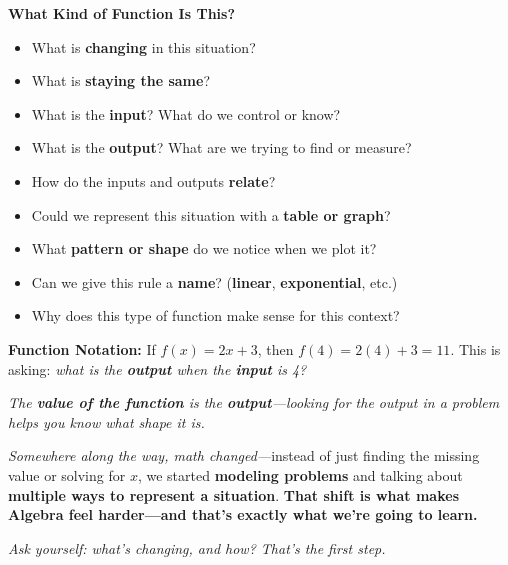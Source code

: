 \documentclass[11pt,landscape]{article}
\begin{document}
\noindent
\begin{minipage}[t]{0.48\textwidth}
\raggedright
\Large\textbf{What Kind of Function Is This?} \\
\normalsize
\vspace{1em}

\begin{itemize}
    \item What is \textbf{changing} in this situation?
    \item What is \textbf{staying the same}?
    \item What is the \textbf{input}? What do we control or know?
    \item What is the \textbf{output}? What are we trying to find or measure?
    \item How do the inputs and outputs \textbf{relate}?
    \item Could we represent this situation with a \textbf{table or graph}?
    \item What \textbf{pattern or shape} do we notice when we plot it?
    \item Can we give this rule a \textbf{name}? (\textbf{linear}, \textbf{exponential}, etc.)
    \item Why does this type of function make sense for this context?
\end{itemize}

\vspace{1em}
\textbf{Function Notation:} If $f(x) = 2x + 3$, then $f(4) = 2(4) + 3 = 11$. This is asking: \textit{what is the \textbf{output} when the \textbf{input} is 4?}

\vspace{1em}
\textit{The \textbf{value of the function} is the \textbf{output}—looking for the output in a problem helps you know what shape it is.}

\vspace{2em}
\textit{Somewhere along the way, math changed—}instead of just finding the missing value or solving for \( x \), we started \textbf{modeling problems} and talking about \textbf{multiple ways to represent a situation}. \textbf{That shift is what makes Algebra feel harder—and that’s exactly what we’re going to learn.}

\vspace{2em}

\vfill
\small\textit{Ask yourself: what’s changing, and how? That’s the first step.}
\end{minipage}%
\end{document}
